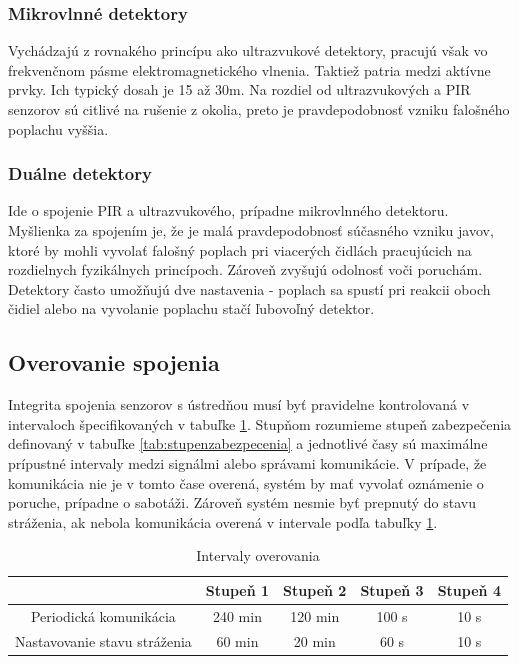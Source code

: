 \subsubsection{Mikrovlnné detektory}

Vychádzajú z rovnakého princípu ako ultrazvukové detektory, pracujú však vo frekvenčnom pásme elektromagnetického vlnenia. Taktiež patria medzi aktívne prvky. Ich typický dosah je 15 až 30m. Na rozdiel od ultrazvukových a PIR senzorov sú citlivé na rušenie z okolia, preto je pravdepodobnosť vzniku falošného poplachu vyššia.\cite{velas_ezs}

\subsubsection{Duálne detektory}

Ide o spojenie PIR a ultrazvukového, prípadne mikrovlnného detektoru. Myšlienka za spojením je, že je malá pravdepodobnosť súčasného vzniku javov, ktoré by mohli vyvolať falošný poplach pri viacerých čidlách pracujúcich na rozdielnych fyzikálnych princípoch. Zároveň zvyšujú odolnosť voči poruchám. Detektory často umožňujú dve nastavenia - poplach sa spustí pri reakcii oboch čidiel alebo na vyvolanie poplachu stačí ľubovoľný detektor.\cite{velas_ezs}

\subsection{Overovanie spojenia}

Integrita spojenia senzorov s ústredňou musí byť pravidelne kontrolovaná v intervaloch špecifikovaných v tabuľke \ref{tab:interval_overenia}. Stupňom rozumieme stupeň zabezpečenia definovaný v tabuľke \ref{tab:stupenzabezpecenia} a jednotlivé časy sú maximálne prípustné intervaly medzi signálmi alebo správami komunikácie. V prípade, že komunikácia nie je v tomto čase overená, systém by mať vyvolať oznámenie o poruche, prípadne o sabotáži. Zároveň systém nesmie byť prepnutý do stavu stráženia, ak nebola komunikácia overená v intervale podľa tabuľky \ref{tab:interval_overenia}.

\begin{table}[ht]
    \centering
    \renewcommand{\arraystretch}{1.5}
    \begin{tabular}{|c|c|c|c|c|}
        \hline
         & Stupeň 1 & Stupeň 2 & Stupeň 3 & Stupeň 4 \\ \hline
        Periodická komunikácia & 240 min & 120 min & 100 s & 10 s \\ \hline
        Nastavovanie stavu stráženia & 60 min & 20 min & 60 s & 10 s\\ \hline
    \end{tabular}
    \caption[Intervaly overovania]{Intervaly overovania\cite{csn-en-50131-1}}
    \label{tab:interval_overenia}
\end{table}



